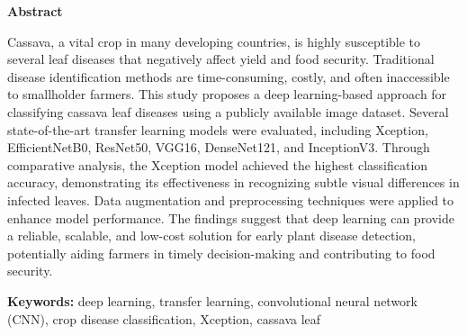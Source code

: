 \thispagestyle{plain}
\begin{center}
    \LARGE{\textbf{Abstract}}
\end{center}

Cassava, a vital crop in many developing countries, is highly susceptible to several leaf diseases that negatively affect yield and food security. Traditional disease identification methods are time-consuming, costly, and often inaccessible to smallholder farmers. This study proposes a deep learning-based approach for classifying cassava leaf diseases using a publicly available image dataset. Several state-of-the-art transfer learning models were evaluated, including Xception, EfficientNetB0, ResNet50, VGG16, DenseNet121, and InceptionV3. Through comparative analysis, the Xception model achieved the highest classification accuracy, demonstrating its effectiveness in recognizing subtle visual differences in infected leaves. Data augmentation and preprocessing techniques were applied to enhance model performance. The findings suggest that deep learning can provide a reliable, scalable, and low-cost solution for early plant disease detection, potentially aiding farmers in timely decision-making and contributing to food security.

\textbf{Keywords:} deep learning, transfer learning, convolutional neural network (CNN), crop disease classification, Xception, cassava leaf
